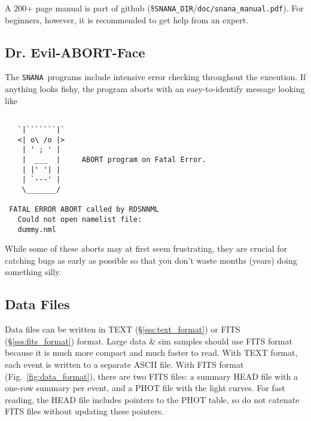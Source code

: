 \documentclass[12pt]{article}
\newcommand{\snana}{{\tt SNANA}}
\newcommand{\snanadir}{{\tt SNANA\_DIR}}
\begin{document}
{A 200+ page manual is part of github 
(\$\snanadir/{\tt doc/snana\_manual.pdf}).
For beginners, however, it is recommended to get help
from an expert.

\subsection{Dr. Evil-ABORT-Face}
\label{abort}

The \snana\ programs include intensive error checking throughout 
the execution. If anything looks fishy, 
the program aborts with an easy-to-identify message looking like
%
\begin{Verbatim}[frame=single]

   `|```````|`    
   <| o\ /o |>    
    | ' ; ' |     
    |  ___  |     ABORT program on Fatal Error. 
    | |' '| |     
    | `---' |     
    \_______/ 

 FATAL ERROR ABORT called by RDSNNML
   Could not open namelist file:
   dummy.nml   
\end{Verbatim}
%
While some of these aborts may at first seem frustrating,
they are crucial for catching bugs as early as possible
so that you don't waste months (years) doing something silly.


\subsection{Data Files}
\label{dataFiles}

Data files can be written in 
TEXT (\S\ref{sss:text_format}) or 
FITS (\S\ref{sss:fits_format}) 
format.
Large data \& sim samples should use FITS format because
it is much more compact and much faster to read.
With TEXT format, each event is written to a separate ASCII file.
With FITS format (Fig.~\ref{fig:data_format}), 
there are two FITS files: a summary HEAD file
with a one-row summary per event, and a PHOT file with the
light curves. For fast reading, the HEAD file includes pointers
to the PHOT table, so do not catenate FITS files without updating
these pointers.

}
\end{document}
